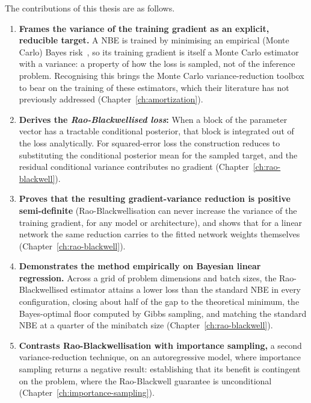 The contributions of this thesis are as follows.

\begin{enumerate}
  \item \textbf{Frames the variance of the training gradient as an
  explicit, reducible target.} A NBE is trained by
  minimising an empirical (Monte Carlo) Bayes
  risk~\citep{sainsburydale2024nbe}, so its training gradient is itself
  a Monte Carlo estimator with a variance: a property of how the
  loss is sampled, not of the inference problem. Recognising this
  brings the Monte Carlo variance-reduction toolbox to bear on the
  training of these estimators, which their literature has not
  previously addressed (Chapter~\ref{ch:amortization}).

  \item \textbf{Derives the \emph{Rao-Blackwellised loss}:} When a block of
  the parameter vector has a tractable conditional posterior, that
  block is integrated out of the loss analytically. For squared-error
  loss the construction reduces to substituting the conditional
  posterior mean for the sampled target, and the residual conditional
  variance contributes no gradient (Chapter~\ref{ch:rao-blackwell}).

  \item \textbf{Proves that the resulting gradient-variance reduction is
  positive semi-definite} (Rao-Black\-wellisation can never increase the
  variance of the training gradient, for any model or architecture), and shows that for a linear network the same reduction carries to
  the fitted network weights themselves (Chapter~\ref{ch:rao-blackwell}).

  \item \textbf{Demonstrates the method empirically on Bayesian linear
  regression.} Across a grid of problem dimensions and batch sizes, the
  Rao-Blackwellised estimator attains a lower loss than the standard NBE in every configuration, closing about half of the gap to
  the theoretical minimum, the Bayes-optimal floor computed by Gibbs sampling, and matching the
  standard NBE at a quarter of the minibatch size
  (Chapter~\ref{ch:rao-blackwell}).

  \item \textbf{Contrasts Rao-Blackwellisation with importance sampling,} a
  second variance-reduction technique, on an autoregressive model,
  where importance sampling returns a negative result: establishing
  that its benefit is contingent on the problem, where the
  Rao-Blackwell guarantee is unconditional
  (Chapter~\ref{ch:importance-sampling}).
\end{enumerate}

